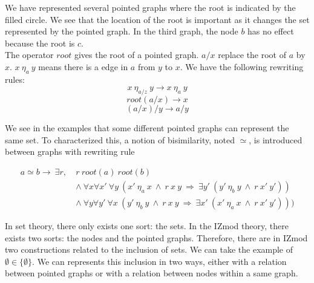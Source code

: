 \documentclass[submission,copyright,creativecommons]{eptcs}
\def\lra{\longrightarrow}
\def\imp{\mathbin{\Rightarrow}}
\def\fa{{\forall}}
\def\conj{\mathbin{\wedge}}
\def\ex{{\exists}}
\begin{document}
We have represented several pointed graphs where the root is indicated by the filled circle. We see that the location of the root is important as it changes the set represented by the pointed graph. In the third graph, the node $b$ has no effect because the root is $c$. \\

The operator $root$ gives the root of a pointed graph. $a/x$ replace the root of $a$ by $x$. $x~\eta_a~y$ means there is a edge in $a$ from $y$ to $x$. We have the following rewriting rules:
$$ x \ \eta_{a/z} \ y \longrightarrow x \ \eta_a \ y $$
$$ root(a/x) \longrightarrow x $$
$$ (a/x)/y \longrightarrow a/y $$

We see in the examples that some different pointed graphs can represent the same set. To characterized this, a notion of  bisimilarity, noted $\simeq$, is introduced between graphs with rewriting rule 

\begin{equation*}
\begin{split}
a \simeq b \lra~\ex r,~ &r~root(a)~root(b) \\
&\conj \ \fa x \fa x'~\fa y~(x'~\eta_a~x~\conj~r~x~y~\imp~\ex y'~(y'~\eta_b~y~\conj~r~x'~y')) \\
&\conj \ \fa y \fa y'~\fa x~(y'~\eta_b~y~\conj~r~x~y~\imp~\ex x'~(x'~\eta_a~x~\conj~r~x'~y')))
\end{split}
\end{equation*}

\begin{figure}[h]
\centering
{}
\end{figure}

In set theory, there only exists one sort: the sets. In the IZmod theory, there exists two sorts: the nodes and the pointed graphs. Therefore, there are in IZmod two constructions related to the inclusion of sets. We can take the example of $\emptyset \in \{\emptyset\}$. We can represents this inclusion in two ways, either with a relation between pointed graphs or with a relation between nodes within a same graph.
\end{document}
